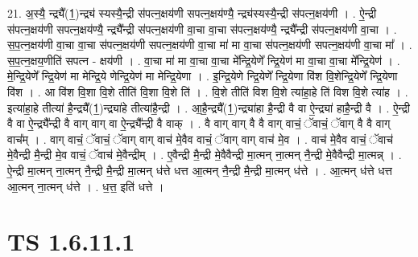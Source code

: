 \documentclass[17pt]{extarticle}
\begin{document}
21. अ॒स्यै॒ न्द्र्यै᳚(1॒)न्द्र्य॑ स्यस्यै॒न्द्री स॑पत्न॒क्षय॑णी सपत्न॒क्षय॑ण्यै॒ न्द्र्य॑स्यस्यै॒न्द्री स॑पत्न॒क्षय॑णी । . ऐ॒न्द्री स॑पत्न॒क्षय॑णी सपत्न॒क्षय॑ण्यै॒ न्द्र्यै᳚न्द्री स॑पत्न॒क्षय॑णी वा॒चा वा॒चा स॑पत्न॒क्षय॑ण्यै॒ न्द्र्यै᳚न्द्री स॑पत्न॒क्षय॑णी वा॒चा । . स॒प॒त्न॒क्षय॑णी वा॒चा वा॒चा स॑पत्न॒क्षय॑णी सपत्न॒क्षय॑णी वा॒चा मा॑ मा वा॒चा स॑पत्न॒क्षय॑णी सपत्न॒क्षय॑णी वा॒चा मा᳚ । . स॒प॒त्न॒क्षय॒णीति॑ सपत्न - क्षय॑णी । . वा॒चा मा॑ मा वा॒चा वा॒चा मे᳚न्द्रि॒येणे᳚ न्द्रि॒येण॑ मा वा॒चा वा॒चा मे᳚न्द्रि॒येण॑ । . मे॒न्द्रि॒येणे᳚ न्द्रि॒येण॑ मा मेन्द्रि॒ये णेन्द्रि॒येण॑ मा मेन्द्रि॒येणा । . इ॒न्द्रि॒येणे न्द्रि॒येणे᳚ न्द्रि॒येणा वि॑श वि॒शेन्द्रि॒येणे᳚ न्द्रि॒येणा वि॑श । . आ वि॑श वि॒शा वि॒शे तीति॑ वि॒शा वि॒शे ति॑ । . वि॒शे तीति॑ विश वि॒शे त्या॑हा॒हे ति॑ विश वि॒शे त्या॑ह । . इत्या॑हा॒हे तीत्या॑ है॒न्द्र्यै᳚(1॒)न्द्र्या॑हे तीत्या॑है॒न्द्री । . आ॒है॒न्द्र्यै᳚(1॒)न्द्र्या॑हा है॒न्द्री वै वा ऐ॒न्द्र्या॑ हाहै॒न्द्री वै । . ऐ॒न्द्री वै वा ऐ॒न्द्र्यै᳚न्द्री वै वाग् वाग् वा ऐ॒न्द्र्यै᳚न्द्री वै वाक् । . वै वाग् वाग् वै वै वाग् वाचं॒ ॅवाचं॒ ॅवाग् वै वै वाग् वाच᳚म् । . वाग् वाचं॒ ॅवाचं॒ ॅवाग् वाग् वाच॑ मे॒वैव वाचं॒ ॅवाग् वाग् वाच॑ मे॒व । . वाच॑ मे॒वैव वाचं॒ ॅवाच॑ मे॒वैन्द्री मै॒न्द्री मे॒व वाचं॒ ॅवाच॑ मे॒वैन्द्रीम् । . ए॒वैन्द्री मै॒न्द्री मे॒वैवैन्द्री मा॒त्मन् ना॒त्मन् नै॒न्द्री मे॒वैवैन्द्री मा॒त्मन्न् । . ऐ॒न्द्री मा॒त्मन् ना॒त्मन् नै॒न्द्री मै॒न्द्री मा॒त्मन् ध॑त्ते धत्त आ॒त्मन् नै॒न्द्री मै॒न्द्री मा॒त्मन् ध॑त्ते । . आ॒त्मन् ध॑त्ते धत्त आ॒त्मन् ना॒त्मन् ध॑त्ते । . ध॒त्त॒ इति॑ धत्ते । \newline
\pagebreak
{}
\section*{ TS 1.6.11.1 }
\end{document}
